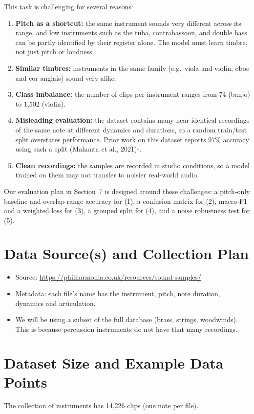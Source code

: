 \documentclass[12pt]{article}
\begin{document}
This task is challenging for several reasons:
\begin{enumerate}
    \item \textbf{Pitch as a shortcut:} the same instrument sounds very different across its range, and
    low instruments such as the tuba, contrabassoon, and double bass can be partly identified by their
    register alone. The model must learn timbre, not just pitch or loudness.
    \item \textbf{Similar timbres:} instruments in the same family (e.g.\ viola and violin, oboe and
    cor anglais) sound very alike.
    \item \textbf{Class imbalance:} the number of clips per instrument ranges from 74 (banjo) to
    1,502 (violin).
    \item \textbf{Misleading evaluation:} the dataset contains many near-identical recordings of the
    same note at different dynamics and durations, so a random train/test split overstates performance.
    Prior work on this dataset reports 97\% accuracy using such a split (Mahanta et al., 2021)-.
    \item \textbf{Clean recordings:} the samples are recorded in studio conditions, so a model trained
    on them may not transfer to noisier real-world audio.
\end{enumerate}
Our evaluation plan in Section~7 is designed around these challenges: a pitch-only baseline and
overlap-range accuracy for (1), a confusion matrix for (2), macro-F1 and a weighted loss for (3), a
grouped split for (4), and a noise robustness test for (5).
\section{Data Source(s) and Collection Plan}
\begin{itemize}
    \item Source: \url{https://philharmonia.co.uk/resources/sound-samples/}
    \item Metadata: each file's name has the instrument, pitch, note duration, dynamics and articulation.
    \item We will be using a subset of the full database (brass, strings, woodwinds). This is because percussion instruments do not have that many recordings.
\end{itemize}
\section{Dataset Size and Example Data Points}
The collection of instruments has 14,226 clips (one note per file).
\end{document}

